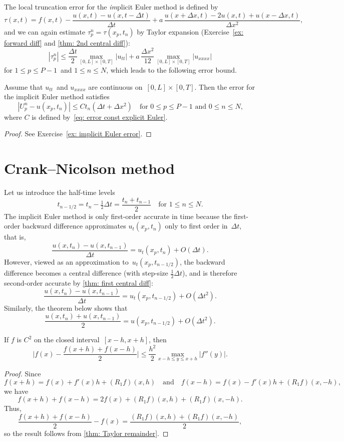 The local truncation error for the \emph{im}plicit Euler method is defined by
\[
\tau(x,t)=f(x,t)-\frac{u(x,t)-u(x,t-\Delta t)}{\Delta t}
	+a\,\frac{u(x+\Delta x,t)-2u(x,t)+u(x-\Delta x,t)}{\Delta x^2},
\]
and we can again estimate $\tau^n_p=\tau(x_p,t_n)$ by Taylor expansion
(Exercise~\ref{ex: forward diff} and \cref{thm: 2nd central diff}):
\[
|\tau^n_p|\le\frac{\Delta t}{2}\max_{[0,L]\times[0,T]}|u_{tt}|
	+a\,\frac{\Delta x^2}{12}\max_{[0,L]\times[0,T]}|u_{xxxx}|
\]
for $1\le p\le P-1$~and $1\le n\le N$, which leads to the following error bound.

\begin{theorem}\label{thm: implicit Euler error}
Assume that $u_{tt}$~and $u_{xxxx}$ are continuous on~$[0,L]\times[0,T]$. Then 
the error for the implicit Euler method satisfies
\[
|U^n_p-u(x_p,t_n)|\le Ct_n(\Delta t+\Delta x^2)
\quad\text{for $0\le p\le P-1$ and $0\le n\le N$,}
\]
where $C$ is defined by~\eqref{eq: error const explicit Euler}.
\end{theorem}
\begin{proof}
See Exercise~\ref{ex: implicit Euler error}.
\end{proof}

\section{Crank--Nicolson method}
Let us introduce the half-time levels
\[
t_{n-1/2}=t_n-\tfrac12\Delta t=\frac{t_n+t_{n-1}}{2}
    \quad\text{for $1\le n\le N$.}
\]
The implicit Euler method is only first-order accurate in time because the 
first-order backward difference approximates $u_t(x_p,t_n)$ only to first order 
in~$\Delta t$, that is,
\[
\frac{u(x,t_n)-u(x,t_{n-1})}{\Delta t}=u_t(x_p,t_n)+O(\Delta t).
\]
However, viewed as an approximation to~$u_t(x_p,t_{n-1/2})$, the backward 
difference becomes a central difference (with step-size $\tfrac12\Delta t$), 
and is therefore second-order accurate by \cref{thm: first central diff}:
\[
\frac{u(x,t_n)-u(x,t_{n-1})}{\Delta t}=u_t(x_p,t_{n-1/2})+O(\Delta t^2).
\]
Similarly, the theorem below shows that
\[
\frac{u(x,t_n)+u(x,t_{n-1})}{2}=u(x_p,t_{n-1/2})+O(\Delta t^2).
\]

\begin{theorem}\label{thm: average}
If $f$ is $C^2$ on the closed interval~$[x-h,x+h]$, then
\[
\biggl|f(x)-\frac{f(x+h)+f(x-h)}{2}\biggr|\le\frac{h^2}{2}
    \max_{x-h\le y\le x+h}|f''(y)|.
\]
\end{theorem}
\begin{proof}
Since
\[
f(x+h)=f(x)+f'(x)h+(R_1f)(x,h)
\quad\text{and}\quad
f(x-h)=f(x)-f'(x)h+(R_1f)(x,-h),
\]
we have
\[
f(x+h)+f(x-h)=2f(x)+(R_1f)(x,h)+(R_1f)(x,-h).
\]
Thus,
\[
\frac{f(x+h)+f(x-h)}{2}-f(x)=\frac{(R_1f)(x,h)+(R_1f)(x,-h)}{2},
\]
so the result follows from \cref{thm: Taylor remainder}.
\end{proof}

